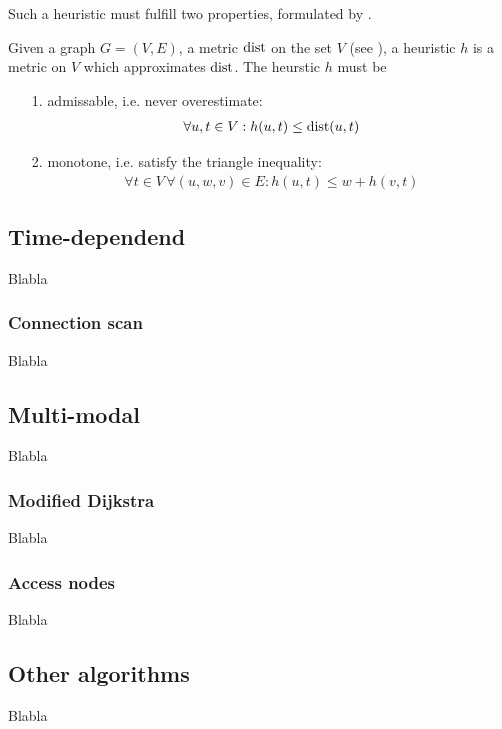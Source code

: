 	Such a heuristic must fulfill two properties, formulated by .
	\begin{mydef}\label{heuristic}
		Given a graph $G = (V, E)$, a metric $\operatorname{dist}$ on the set $V$ (see ), a \textnormal{heuristic} $h$
		is a metric on $V$ which approximates $\operatorname{dist}$. The heurstic $h$ must be
		\begin{itemize}
			\item[1.] \textnormal{admissable}, i.e. never overestimate:
				\begin{align*}
					\forall u, t \in V: h(u, t) \le \operatorname{dist}(u, t)
				\end{align*}
			\item[2.] \textnormal{monotone}, i.e. satisfy the triangle inequality:
				\begin{align*}
					\forall t \in V\,\forall (u, w, v) \in E: h(u, t) \le w + h(v, t)
				\end{align*}
		\end{itemize}
	\end{mydef}

\subsection{Time-dependend}
	Blabla

\subsubsection{Connection scan}\label{csa}
	Blabla

\subsection{Multi-modal}
	Blabla

\subsubsection{Modified Dijkstra}\label{modifiedDijkstra}
	Blabla

\subsubsection{Access nodes}\label{accessNodes}
	Blabla

\subsection{Other algorithms}
	Blabla